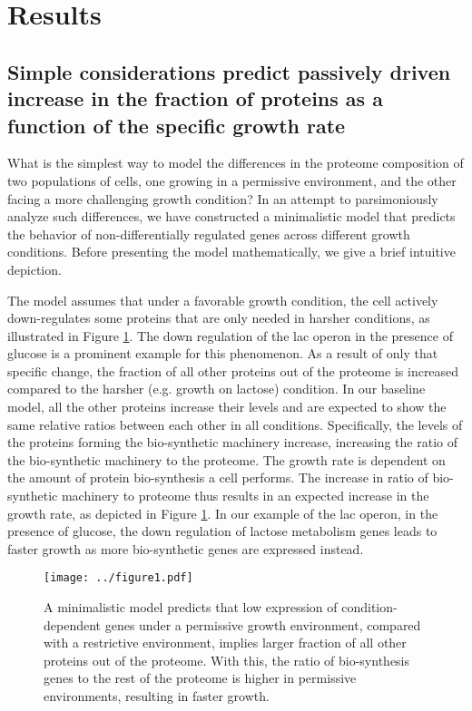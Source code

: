 \documentclass{article}
\begin{document}
\section{Results}

\subsection{Simple considerations predict passively driven increase in the fraction of proteins as a function of the specific growth rate}
What is the simplest way to model the differences in the proteome composition of two populations of cells, one growing in a permissive environment, and the other facing a more challenging growth condition?
In an attempt to parsimoniously analyze such differences, we have constructed a minimalistic model that predicts the behavior of non-differentially regulated genes across different growth conditions.
Before presenting the model mathematically, we give a brief intuitive depiction.

The model assumes that under a favorable growth condition, the cell actively down-regulates some proteins that are only needed in harsher conditions, as illustrated in Figure \ref{fig:model}.
The down regulation of the lac operon in the presence of glucose is a prominent example for this phenomenon.
As a result of only that specific change, the fraction of all other proteins out of the proteome is increased compared to the harsher (e.g. growth on lactose) condition.
In our baseline model, all the other proteins increase their levels and are expected to show the same relative ratios between each other in all conditions.
Specifically, the levels of the proteins forming the bio-synthetic machinery increase, increasing the ratio of the bio-synthetic machinery to the proteome.
The growth rate is dependent on the amount of protein bio-synthesis a cell performs.
The increase in ratio of bio-synthetic machinery to proteome thus results in an expected increase in the growth rate, as depicted in Figure \ref{fig:model}.
In our example of the lac operon, in the presence of glucose, the down regulation of lactose metabolism genes leads to faster growth as more bio-synthetic genes are expressed instead.

\begin{figure}[H]
\begin{center}
\texttt{[image: ../figure1.pdf]}
\caption{\label{fig:model}
A minimalistic model predicts that low expression of condition-dependent genes under a permissive growth environment, compared with a restrictive environment, implies larger fraction of all other proteins out of the proteome.
With this, the ratio of bio-synthesis genes to the rest of the proteome is higher in permissive environments, resulting in faster growth.
%
}
\end{center}
\end{figure}
\end{document}
